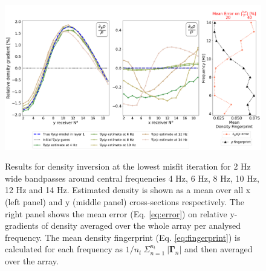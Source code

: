 \documentclass{article} %
\begin{document}
	
	\begin{figure}[H] 
		\vspace{-0.5cm}
		\centering
		{\includegraphics[width =\textwidth, keepaspectratio]{../Figures/freq_study_RHOgrad_REL.png}}
		\caption{Results for density inversion at the lowest misfit iteration for 2 Hz wide bandpasses around central frequencies 4 Hz, 6 Hz, 8 Hz, 10 Hz, 12 Hz and 14 Hz. Estimated density is shown as a mean over all x (left panel) and y (middle panel) cross-sections respectively. The right panel shows the mean error (Eq. \ref{eq:error}) on relative y-gradients of density averaged over the whole array per analysed frequency. The mean density fingerprint (Eq. \ref{eq:fingerprint}) is calculated for each frequency as $ 1/n_{t} \: \Sigma_{n=1}^{n_{t}} \: |\bm{\Gamma}_{n}|$ and then averaged over the array.}\label{fig:freq_rho}
	\end{figure}
\end{document}
